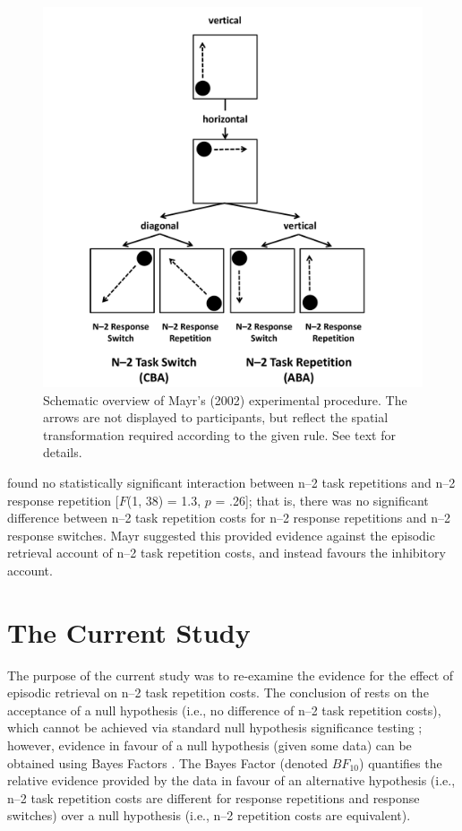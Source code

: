 \documentclass[a4paper, doc, natbib]{apa6}
\begin{document}
\begin{figure}
\begin{center}
\includegraphics[width = \textwidth]{Images/mayrExperiment.pdf}
\caption{Schematic overview of Mayr's (2002) experimental procedure. The arrows are not displayed to participants, but reflect the spatial transformation required according to the given rule. See text for details.}
\label{fig:mayrExperiment}
\end{center}
\end{figure}

\cite{Mayr2002} found no statistically significant interaction between n--2 task repetitions and n--2 response repetition [$F$(1, 38) = 1.3, $p$ = .26]; that is, there was no significant difference between n--2 task repetition costs for n--2 response repetitions and n--2 response switches. Mayr suggested this provided evidence against the episodic retrieval account of n--2 task repetition costs, and instead favours the inhibitory account.

\section{The Current Study}
The purpose of the current study was to re-examine the evidence for the effect of episodic retrieval on n--2 task repetition costs. The conclusion of \cite{Mayr2002} rests on the acceptance of a null hypothesis (i.e., no difference of n--2 task repetition costs), which cannot be achieved via standard null hypothesis significance testing \citep[NHST;][]{Gallistel2009, Wagenmakers2007}; however, evidence in favour of a null hypothesis (given some data) can be obtained using Bayes Factors \citep[e.g.,][]{Rouder2009}. The Bayes Factor (denoted $BF_{10}$) quantifies the relative evidence provided by the data in favour of an alternative hypothesis (i.e., n--2 task repetition costs are different for response repetitions and response switches) over a null hypothesis (i.e., n--2 repetition costs are equivalent). 
\end{document}
